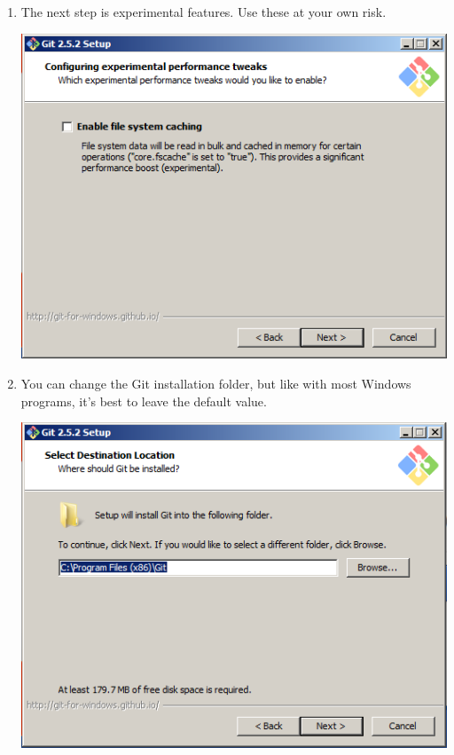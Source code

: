 \documentclass[11pt,fleqn]{article}
\theoremstyle{definition}
\begin{document}
\begin{enumerate}[Step 1.]
\item The next step is experimental features. Use these at your own risk.
\begin{center}
\includegraphics[scale=0.6]{gitwininstall5.png}
\end{center}

\item You can change the Git installation folder, but like with most Windows
    programs, it's best to leave the default value.
\begin{center}
\includegraphics[scale=0.6]{gitwininstall6.png}
\end{center}


\end{enumerate}
\end{document}
